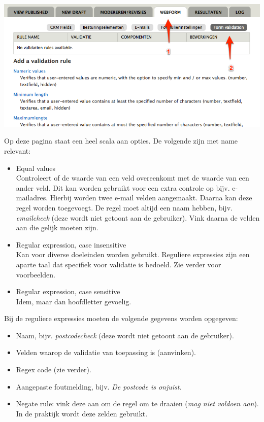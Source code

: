 \begin{center}
\includegraphics[width=\textwidth]{img/formvalidation.png}
\end{center}

Op deze pagina staat een heel scala aan opties. De volgende zijn met name relevant:
\begin{itemize}
\item Equal values \\
Controleert of de waarde van een veld overeenkomt met de waarde van een ander veld. Dit kan worden gebruikt voor een extra controle op bijv. e-mailadres. Hierbij worden twee e-mail velden aangemaakt. Daarna kan deze regel worden toegevoegt. De regel moet altijd een naam hebben, bijv. \emph{emailcheck} (deze wordt niet getoont aan de gebruiker). Vink daarna de velden aan die gelijk moeten zijn.
\item Regular expression, case insensitive \\
Kan voor diverse doeleinden worden gebruikt. Reguliere expressies zijn een aparte taal dat specifiek voor validatie is bedoeld. Zie verder voor voorbeelden.
\item Regular expression, case sensitive \\
Idem, maar dan hoofdletter gevoelig.
\end{itemize}
Bij de reguliere expressies moeten de volgende gegevens worden opgegeven:
\begin{itemize}
\item Naam, bijv. \emph{postcodecheck} (deze wordt niet getoont aan de gebruiker).
\item Velden waarop de validatie van toepassing is (aanvinken).
\item Regex code (zie verder).
\item Aangepaste foutmelding, bijv. \emph{De postcode is onjuist.}
\item Negate rule: vink deze aan om de regel om te draaien (\emph{mag niet voldoen aan}). In de praktijk wordt deze zelden gebruikt.
\end{itemize}
